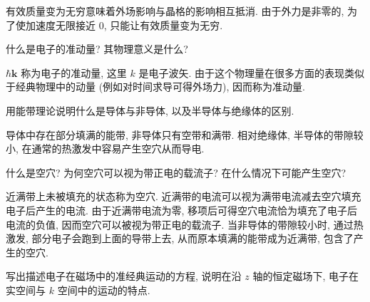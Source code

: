 \documentclass[UTF8]{ctexart}
\newenvironment{Answer}{}{}
\begin{document}
\begin{Question}
\begin{Answer}
\begin{Solve}[Solve:]
        \hspace*{2em}有效质量变为无穷意味着外场影响与晶格的影响相互抵消. 由于外力是非零的, 为了使加速度无限接近 0, 只能让有效质量变为无穷.
    \end{Solve}
\end{Answer}

            \item 什么是电子的准动量? 其物理意义是什么?

\begin{Answer}
    \begin{Solve}[Solve:]
        \hspace*{2em}$\hbar \bm{k}$ 称为电子的准动量, 这里 $k$ 是电子波矢. 由于这个物理量在很多方面的表现类似于经典物理中的动量 (例如对时间求导可得外场力), 因而称为准动量.
    \end{Solve}
\end{Answer}

            \item 用能带理论说明什么是导体与非导体, 以及半导体与绝缘体的区别.

\begin{Answer}
    \begin{Solve}[Solve:]
        \hspace*{2em}导体中存在部分填满的能带, 非导体只有空带和满带. 相对绝缘体, 半导体的带隙较小, 在通常的热激发中容易产生空穴从而导电.
    \end{Solve}
\end{Answer}

            \item 什么是空穴? 为何空穴可以视为带正电的载流子? 在什么情况下可能产生空穴?

\begin{Answer}
    \begin{Solve}[Solve:]
        \hspace*{2em}近满带上未被填充的状态称为空穴. 近满带的电流可以视为满带电流减去空穴填充电子后产生的电流. 由于近满带电流为零, 移项后可得空穴电流恰为填充了电子后电流的负值, 因而空穴可以被视为带正电的载流子. 当非导体的带隙较小时, 通过热激发, 部分电子会跑到上面的导带上去, 从而原本填满的能带成为近满带, 包含了产生的空穴.
    \end{Solve}
\end{Answer}

            \item 写出描述电子在磁场中的准经典运动的方程, 说明在沿 $z$ 轴的恒定磁场下, 电子在实空间与 $k$ 空间中的运动的特点.


\end{Question}
\end{document}
